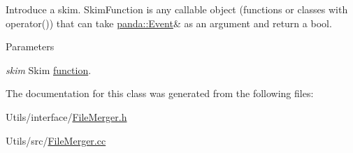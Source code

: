 Introduce a skim. SkimFunction is any callable object (functions or classes with operator()) that can take \hyperlink{classpanda_1_1Event}{panda::Event}\& as an argument and return a bool.


\begin{DoxyParams}{Parameters}
\item[{\em skim}]Skim \hyperlink{namespacepanda_1_1function}{function}. \end{DoxyParams}


The documentation for this class was generated from the following files:\begin{DoxyCompactItemize}
\item 
Utils/interface/\hyperlink{FileMerger_8h}{FileMerger.h}\item 
Utils/src/\hyperlink{FileMerger_8cc}{FileMerger.cc}\end{DoxyCompactItemize}
